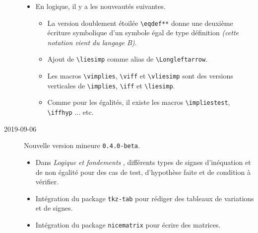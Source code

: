 \documentclass[12pt,a4paper]{article}
\begin{document}
\begin{description}
\begin{itemize}[itemsep=.5em]
    
        \item En logique, il y a les nouveautés suivantes.
        \begin{itemize}[itemsep=.5em]
            \item La version doublement étoilée \verb+\eqdef**+ donne une deuxième écriture symbolique d'un symbole égal de type définition \emph{(cette notation vient du langage B)}.
    
            \item Ajout de \verb+\liesimp+ comme alias de \verb+\Longleftarrow+.
    
            \item Les macros \verb+\vimplies+, \verb+\viff+ et \verb+\vliesimp+ sont des versions verticales de \verb+\implies+, \verb+\iff+ et \verb+\liesimp+.
    
            \item Comme pour les égalités, il existe les macros \verb+\impliestest+, \verb+\iffhyp+ ... etc.
        \end{itemize}
    \end{itemize}


    \medskip
    \item[2019-09-06] Nouvelle version mineure \verb+0.4.0-beta+.
    
    \begin{itemize}[itemsep=.5em]
        \item Dans \emph{\og Logique et fondements \fg}, différents types de signes d'inéquation et de non égalité pour des cas de test, d'hypothèse faite et de condition à vérifier.
    
    
        \item Intégration du package \verb+tkz-tab+ pour rédiger des tableaux de variations et de signes.
    
    
        \item Intégration du package \verb+nicematrix+ pour écrire des matrices.
    \end{itemize}


\end{description}
\end{document}
